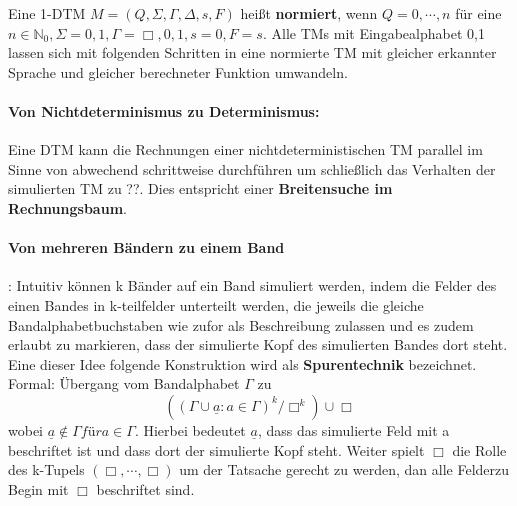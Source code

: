 \newpage

  Eine 1-DTM \(M = (Q, \Sigma, \Gamma, \Delta, s, F)\) heißt \textbf{normiert}, wenn \(Q = {0,\cdots, n}\) für eine \(n \in \mathbb{N}_{0}, \Sigma = {0, 1}, \Gamma = {\Box, 0, 1}, s = 0, F = {s}\). Alle TMs mit Eingabealphabet {0,1} lassen sich mit folgenden Schritten in eine normierte TM mit gleicher erkannter Sprache und gleicher berechneter Funktion umwandeln. 
\paragraph*{Von Nichtdeterminismus zu Determinismus:} 
  Eine DTM kann die Rechnungen einer nichtdeterministischen TM parallel im Sinne von abwechend schrittweise durchführen um schließlich das Verhalten der simulierten TM zu ??. Dies entspricht einer \textbf{Breitensuche im Rechnungsbaum}.
  {}


  \paragraph{Von mehreren Bändern zu einem Band}: Intuitiv können k Bänder auf ein Band simuliert werden, indem die Felder des einen Bandes in k-teilfelder unterteilt werden, die jeweils die gleiche Bandalphabetbuchstaben wie zufor als Beschreibung zulassen und es zudem erlaubt zu markieren, dass der simulierte Kopf des simulierten Bandes dort steht. Eine dieser Idee folgende Konstruktion wird als \textbf{Spurentechnik} bezeichnet. Formal: Übergang vom Bandalphabet \(\Gamma\) zu 
  \[
    ((\Gamma \cup{\underline{a} : a \in \Gamma})^{k}/{\Box}^{k}) \cup {\Box}
  \] 
  wobei \(\underline{a} \not \in \Gamma für a \in \Gamma\). Hierbei bedeutet \(\underline{a}\), dass das simulierte Feld mit a beschriftet ist und dass dort der simulierte Kopf steht. Weiter spielt \(\Box\) die Rolle des k-Tupels \((\Box, \cdots, \Box)\) um der Tatsache gerecht zu werden, dan alle Felderzu Begin mit \(\Box\) beschriftet sind.
  

